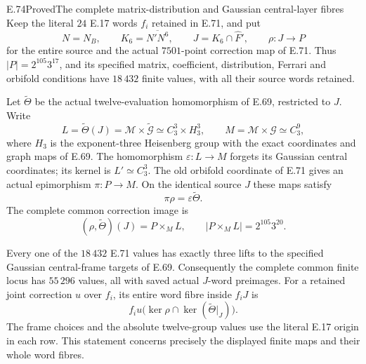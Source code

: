 \begin{statement}{E.74}{Proved}{The complete matrix-distribution and Gaussian central-layer fibres}
Keep the literal $24$ E.17 words $f_i$ retained in E.71, and put
\[
 N=N_B,\qquad K_6=\overline{N'N^6},\qquad
 J=K_6\cap\widehat F',\qquad
 \rho:J\longrightarrow P
 \tag{E.74.1}
\]
for the entire source and the actual $7501$-point correction map of
E.71. Thus $|P|=2^{105}3^{17}$, and its specified matrix,
coefficient, distribution, Ferrari and orbifold conditions have
$18\,432$ finite values, with all their source words retained.

Let $\widetilde\Theta$ be the actual twelve-evaluation homomorphism
of E.69, restricted to $J$. Write
\[
 L=\widetilde\Theta(J)=\mathcal M\times\widetilde{\mathcal G}
       \simeq C_3^3\times H_3^3,
 \qquad M=\mathcal M\times\mathcal G\simeq C_3^9,
 \tag{E.74.2}
\]
where $H_3$ is the exponent-three Heisenberg group with the exact
coordinates and graph maps of E.69. The homomorphism
$\varepsilon:L\to M$ forgets its Gaussian central coordinates;
its kernel is $L'\simeq C_3^3$. The old orbifold coordinate of
E.71 gives an actual epimorphism $\pi:P\to M$. On the identical
source $J$ these maps satisfy
\[
       \pi\rho=\varepsilon\widetilde\Theta.
 \tag{E.74.3}
\]
The complete common correction image is
\[
       (\rho,\widetilde\Theta)(J)=P\times_M L,
       \qquad |P\times_M L|=2^{105}3^{20}.
 \tag{E.74.4}
\]

Every one of the $18\,432$ E.71 values has exactly three lifts
to the specified Gaussian central-frame targets of E.69.
Consequently the complete common finite locus has $55\,296$
values, all with saved actual $J$-word preimages. For a retained
joint correction $u$ over $f_i$, its entire word fibre inside
$f_iJ$ is
\[
       f_i u\bigl(\ker\rho\cap\ker(\widetilde\Theta|_J)\bigr).
 \tag{E.74.5}
\]
The frame choices and the absolute twelve-group values use the
literal E.17 origin in each row. This statement concerns precisely
the displayed finite maps and their whole word fibres.
\end{statement}
